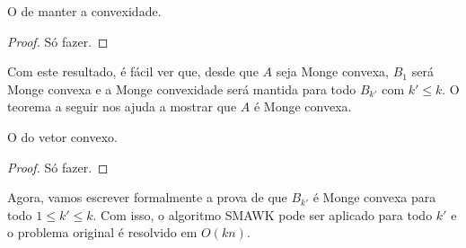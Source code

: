 \begin{theo}
O de manter a convexidade.
\end{theo}

\begin{proof}
Só fazer.
\end{proof}

Com este resultado, é fácil ver que, desde que $A$ seja Monge convexa, $B_1$ será Monge convexa e a Monge convexidade será mantida para todo $B_{k'}$ com $k' \leq k$. O teorema a seguir nos ajuda a mostrar que $A$ é Monge convexa.

\begin{theo}
O do vetor convexo.
\end{theo}

\begin{proof}
Só fazer.
\end{proof}

Agora, vamos escrever formalmente a prova de que $B_{k'}$ é Monge convexa para todo $1 \leq k' \leq k$. Com isso, o algoritmo SMAWK pode ser aplicado para todo $k'$ e o problema original é resolvido em $O(kn)$.
